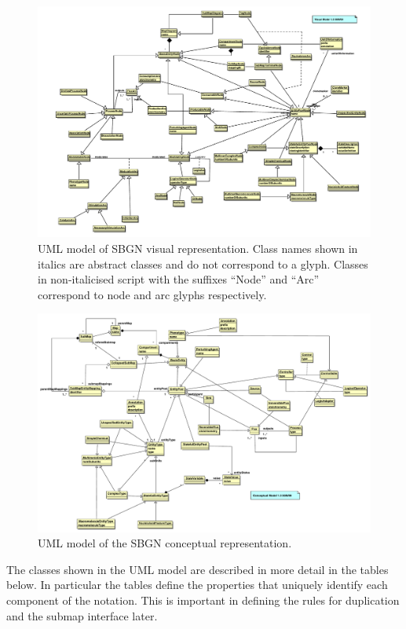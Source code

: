  \begin{landscape}
\begin{figure}[p]
\begin{center}
\includegraphics[width=0.85\linewidth]{images/sbgn_visual}
\caption{UML model of SBGN visual representation. Class names shown in italics are abstract classes and do not correspond to a glyph. Classes in non-italicised script with the suffixes ``Node'' and ``Arc'' correspond to node and arc glyphs respectively.}
\label{fig:sbgn_visual}
\end{center}
\end{figure}

\begin{figure}[p]
\begin{center}
\includegraphics[width=0.85\linewidth]{images/sbgn_conceptual}
\caption{UML model of the SBGN conceptual representation.}
\label{fig:sbgn_conceptual}
\end{center}
\end{figure}
\end{landscape}
The classes shown in the UML model are described in more detail in the
tables below. In particular the tables define the properties that
uniquely identify each component of the notation. This is important in
defining the rules for duplication and the submap interface later.

